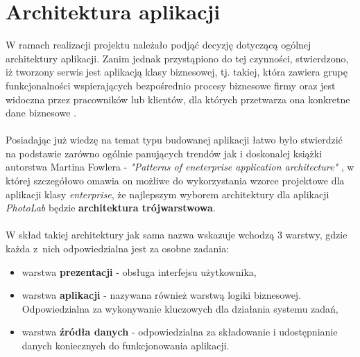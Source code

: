 \section{Architektura aplikacji}
\quad W ramach realizacji projektu należało podjąć decyzję dotyczącą ogólnej architektury aplikacji. Zanim jednak przystąpiono do tej czynności, stwierdzono, iż tworzony serwis jest aplikacją klasy biznesowej, tj. takiej, która zawiera grupę funkcjonalności wspierających bezpośrednio procesy biznesowe firmy oraz jest widoczna przez pracowników lub klientów, dla których przetwarza ona konkretne dane biznesowe \cite{patterns-of-architecture}. \\
\\
Posiadając już wiedzę na temat typu budowanej aplikacji łatwo było stwierdzić na podstawie zarówno ogólnie panujących trendów jak i doskonalej książki autorstwa Martina Fowlera - \textit{"Patterns of eneterprise application architecture"} \cite{patterns-of-architecture}, w której szczegółowo omawia on możliwe do wykorzystania wzorce projektowe dla aplikacji klasy \textit{enterprise}, że najlepszym wyborem architektury dla aplikacji \textit{PhotoLab} będzie \textbf{architektura trójwarstwowa}. \\
\\
W skład takiej architektury jak sama nazwa wskazuje wchodzą 3 warstwy, gdzie każda z~nich odpowiedzialna jest za osobne zadania:
\begin{itemize}
    \item warstwa \textbf{prezentacji} - obsługa interfejsu użytkownika,
    \item warstwa \textbf{aplikacji} - nazywana również warstwą logiki biznesowej. Odpowiedzialna za wykonywanie kluczowych dla działania systemu zadań,
    \item warstwa \textbf{źródła danych} - odpowiedzialna za składowanie i udostępnianie danych koniecznych do funkcjonowania aplikacji.
\end{itemize}
